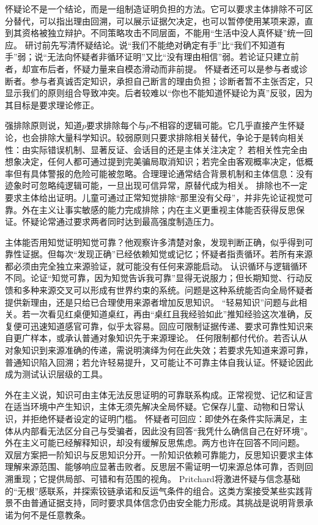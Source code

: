  怀疑论不是一个结论，而是一组制造证明负担的方法。它可以要求主体排除不可区分替代，可以指出理由回溯，可以展示证据欠决定，也可以暂停使用某项来源，直到其资格被独立辩护。不同策略攻击不同层面，不能用“生活中没人真怀疑”统一回应。 研讨前先写清怀疑结论。说“我们不能绝对确定有手”比“我们不知道有手”弱；说“无法向怀疑者非循环证明”又比“没有理由相信”弱。若论证只建立前者，却宣布后者，怀疑力量来自模态滑动而非前提。 怀疑者还可以是参与者或诊断者。参与者真诚否定知识，承担自己断言的理由负担；诊断者暂不主张否定，只显示我们的原则组合导致冲突。后者较难以“你也不能知道怀疑论为真”反驳，因为其目标是要求理论修正。

强排除原则说，知道$p$要求排除每个与$p$不相容的逻辑可能。它几乎直接产生怀疑论，也会排除大量科学知识。较弱原则只要求排除相关替代，争论于是转向相关性：由实际错误机制、显著反证、会话目的还是主体关注决定？ 若相关性完全由想象决定，任何人都可通过提到完美骗局取消知识；若完全由客观概率决定，低概率但有具体警报的危险可能被忽略。合理理论通常结合背景机制和主体信息：没有迹象时可忽略纯逻辑可能，一旦出现可信异常，原替代成为相关。 排除也不一定要求主体给出证明。儿童可通过正常知觉排除“那里没有父母”，并非先论证视觉可靠。外在主义让事实敏感的能力完成排除；内在主义更重视主体能否获得反思保证。怀疑论常通过要求两者同时达到最高强度制造压力。

主体能否用知觉证明知觉可靠？他观察许多清楚对象，发现判断正确，似乎得到可靠性证据。但每次“发现正确”已经依赖知觉或记忆；怀疑者指责循环。若所有来源都必须由完全独立来源验证，就可能没有任何来源能启动。 认识循环与逻辑循环不同。论证“知觉可靠，因为知觉告诉我可靠”显得无说服力；但长期知觉、行动反馈和多种来源交叉可以形成有世界约束的系统。问题是这种系统能否向全局怀疑者提供新理由，还是只给已合理使用来源者增加反思知识。 “轻易知识”问题与此相关。若一次看见红桌便知道桌红，再由“桌红且我经验如此”推知经验这次准确，反复便可迅速知道感官可靠，似乎太容易。回应可限制证据传递、要求可靠性知识来自更广样本，或承认普通对象知识先于来源理论。 任何限制都付代价。若否认从对象知识到来源准确的传递，需说明演绎为何在此失效；若要求先知道来源可靠，普通知识陷入回溯；若允许轻易提升，又可能让不可靠主体自我认证。怀疑论因此成为测试认识层级的工具。

外在主义说，知识可由主体无法反思证明的可靠联系构成。正常视觉、记忆和证言在适当环境中产生知识，主体无须先解决全局怀疑。它保存儿童、动物和日常认识，并拒绝怀疑者设定的证明门槛。 怀疑者可回应：即使外在条件实际满足，主体从内部看无法区分自己与受骗者，因此没有回答“我凭什么确信自己在好环境”。外在主义可能已经解释知识，却没有缓解反思焦虑。两方也许在回答不同问题。 双层方案把一阶知识与反思知识分开。一阶知识依赖可靠能力，反思知识要求主体理解来源范围、能够响应显著击败者。反思层不需证明一切来源总体可靠，否则回溯重现；它提供局部、可错和有范围的视角。 Pritchard将激进怀疑与信念基础的“无根”感联系，并探索铰链承诺和反运气条件的组合\parencite{pritchard2016}。这类方案接受某些实践背景不由普通证据支持，同时要求具体信念仍由安全能力形成。其挑战是说明背景承诺为何不是任意教条。

